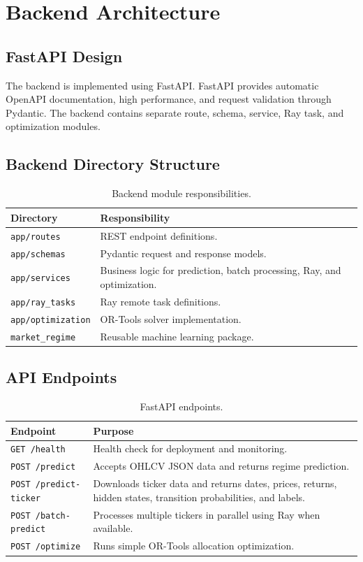 \documentclass[12pt,a4paper]{report}
\begin{document}
\chapter{Backend Architecture}
\section{FastAPI Design}
The backend is implemented using FastAPI. FastAPI provides automatic OpenAPI documentation, high performance, and request validation through Pydantic. The backend contains separate route, schema, service, Ray task, and optimization modules.

\section{Backend Directory Structure}
\begin{table}[H]
\centering
\caption{Backend module responsibilities.}
\begin{tabular}{p{}p{}}
\toprule
\textbf{Directory} & \textbf{Responsibility} \\
\midrule
\texttt{app/routes} & REST endpoint definitions. \\
\texttt{app/schemas} & Pydantic request and response models. \\
\texttt{app/services} & Business logic for prediction, batch processing, Ray, and optimization. \\
\texttt{app/ray\_tasks} & Ray remote task definitions. \\
\texttt{app/optimization} & OR-Tools solver implementation. \\
\texttt{market\_regime} & Reusable machine learning package. \\
\bottomrule
\end{tabular}
\end{table}

\section{API Endpoints}
\begin{table}[H]
\centering
\caption{FastAPI endpoints.}
\begin{tabular}{p{}p{}}
\toprule
\textbf{Endpoint} & \textbf{Purpose} \\
\midrule
\texttt{GET /health} & Health check for deployment and monitoring. \\
\texttt{POST /predict} & Accepts OHLCV JSON data and returns regime prediction. \\
\texttt{POST /predict-ticker} & Downloads ticker data and returns dates, prices, returns, hidden states, transition probabilities, and labels. \\
\texttt{POST /batch-predict} & Processes multiple tickers in parallel using Ray when available. \\
\texttt{POST /optimize} & Runs simple OR-Tools allocation optimization. \\
\bottomrule
\end{tabular}
\end{table}
\end{document}
